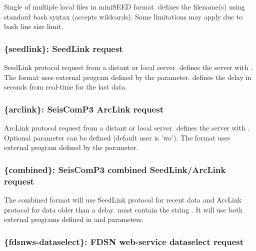 Single of multiple local files in miniSEED format.  defines the filename(s) using standard bash syntax (accepts wildcards). Some limitations may apply due to bash line size limit.


\subsubsection{\{seedlink\}: SeedLink request}
\label{seedlink}

SeedLink protocol request from a distant or local server.  defines the server with . The format uses external program  defined by the   parameter.  defines the delay in seconds from real-time for the last data.


\subsubsection{\{arclink\}: SeisComP3 ArcLink request}
\label{arclink}

ArcLink protocol request from a distant or local server.  defines the server with . Optional parameter  can be defined (default user is 'wo'). The format uses external program  defined by the   parameter.

\subsubsection{\{combined\}: SeisComP3 combined SeedLink/ArcLink request}

The combined format will use SeedLink protocol for recent data and ArcLink protocol for data older than a delay.  must contain the string . It will use both external programs defined in   and  parameters.

\subsubsection{\{fdsnws-dataselect\}: FDSN web-service dataselect request}


